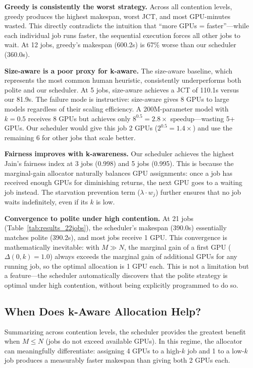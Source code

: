 \documentclass[letterpaper,10pt]{article}
\begin{document}
\textbf{Greedy is consistently the worst strategy.} Across all contention levels, greedy produces the highest makespan, worst JCT, and most GPU-minutes wasted. This directly contradicts the intuition that ``more GPUs = faster''---while each individual job runs faster, the sequential execution forces all other jobs to wait. At 12 jobs, greedy's makespan (600.2s) is 67\% worse than our scheduler (360.0s).

\textbf{Size-aware is a poor proxy for k-aware.} The size-aware baseline, which represents the most common human heuristic, consistently underperforms both polite and our scheduler. At 5 jobs, size-aware achieves a JCT of 110.1s versus our 81.9s. The failure mode is instructive: size-aware gives 8 GPUs to large models regardless of their scaling efficiency. A 200M-parameter model with $k = 0.5$ receives 8 GPUs but achieves only $8^{0.5} = 2.8\times$ speedup---wasting 5+ GPUs. Our scheduler would give this job 2 GPUs ($2^{0.5} = 1.4\times$) and use the remaining 6 for other jobs that scale better.

\textbf{Fairness improves with k-awareness.} Our scheduler achieves the highest Jain's fairness index at 3 jobs (0.998) and 5 jobs (0.995). This is because the marginal-gain allocator naturally balances GPU assignments: once a job has received enough GPUs for diminishing returns, the next GPU goes to a waiting job instead. The starvation prevention term ($\lambda \cdot w_j$) further ensures that no job waits indefinitely, even if its $k$ is low.

\textbf{Convergence to polite under high contention.} At 21 jobs (Table~\ref{tab:results_22jobs}), the scheduler's makespan (390.0s) essentially matches polite (390.2s), and most jobs receive 1 GPU. This convergence is mathematically inevitable: with $M \gg N$, the marginal gain of a first GPU ($\Delta(0, k) = 1.0$) always exceeds the marginal gain of additional GPUs for any running job, so the optimal allocation is 1 GPU each. This is not a limitation but a feature---the scheduler automatically discovers that the polite strategy is optimal under high contention, without being explicitly programmed to do so.

\subsection{When Does k-Aware Allocation Help?}

Summarizing across contention levels, the scheduler provides the greatest benefit when $M \leq N$ (jobs do not exceed available GPUs). In this regime, the allocator can meaningfully differentiate: assigning 4 GPUs to a high-$k$ job and 1 to a low-$k$ job produces a measurably faster makespan than giving both 2 GPUs each.
\end{document}
